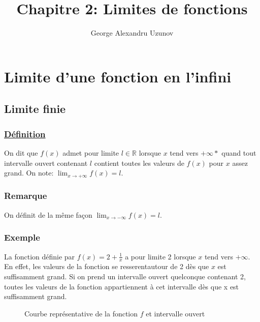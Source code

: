 \documentclass[9pt,twoside]{article}
\title{Chapitre 2: Limites de fonctions}
\author{George Alexandru Uzunov}
\date{}
\begin{document}
\maketitle
\tableofcontents\newpage

\section{Limite d'une fonction en l'infini}

\subsection{Limite finie}

\subsubsection*{\underline{Définition}}

On dit que $f(x)$ admet pour limite $l \in \mathbb{R}$ lorsque $x$ tend vers $+\infty*$ quand tout intervalle ouvert contenant $l$ contient toutes les valeurs de $f(x)$ pour $x$ assez grand. On note: $\lim_{x \to +\infty}f(x) = l$.

\subsubsection*{Remarque}

On définit de la même façon $\lim_{x \to -\infty}f(x)=l$.

\subsubsection*{Exemple}

La fonction définie par $f(x)=2+\frac{1}{x}$ a pour limite 2 lorsque $x$ tend vers $+\infty$. \\ En effet, les valeurs de la fonction se resserentautour de 2 dès que $x$ est suffisamment grand. Si on prend un intervalle ouvert quelconque contenant 2, toutes les valeurs de la fonction appartiennent à cet intervalle dès que x est suffisamment grand.

\begin{figure}[H]
	\centering
	\caption{Courbe représentative de la fonction $f$ et intervalle ouvert}
\end{figure}
\end{document}
